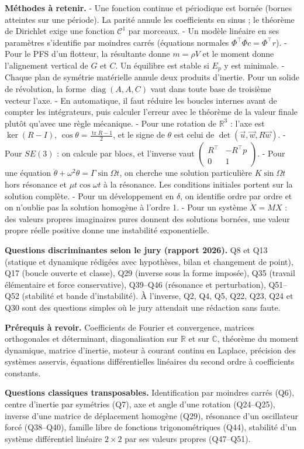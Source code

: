 \documentclass[11pt,a4paper]{article}
\begin{document}
\textbf{Méthodes à retenir.}
- Une fonction continue et périodique est bornée (bornes atteintes sur une période). La parité annule les coefficients en sinus ; le théorème de Dirichlet exige une fonction \(\mathcal C^1\) par morceaux.
- Un modèle linéaire en ses paramètres s'identifie par moindres carrés (équations normales \(\Phi^\top\Phi c=\Phi^\top r\)).
- Pour le PFS d'un flotteur, la résultante donne \(m=\rho V\) et le moment donne l'alignement vertical de \(G\) et \(C\). Un équilibre est stable si \(E_p\) y est minimale.
- Chaque plan de symétrie matérielle annule deux produits d'inertie. Pour un solide de révolution, la forme \(\operatorname{diag}(A,A,C)\) vaut dans toute base de troisième vecteur l'axe.
- En automatique, il faut réduire les boucles internes avant de compter les intégrateurs, puis calculer l'erreur avec le théorème de la valeur finale plutôt qu'avec une règle mécanique.
- Pour une rotation de \({\mathbb{R}}^3\) : l'axe est \(\ker(R-I)\), \(\cos\theta=\frac{\operatorname{tr}R-1}2\), et le signe de \(\theta\) est celui de \(\det(\vec u,\vec w,R\vec w)\).
- Pour \(SE(3)\) : on calcule par blocs, et l'inverse vaut \(\begin{pmatrix}R^\top&-R^\top p\\0&1\end{pmatrix}\).
- Pour une équation \(\ddot\theta+\omega^2\theta=\Gamma\sin\Omega t\), on cherche une solution particulière \(K\sin\Omega t\) hors résonance et \(\mu t\cos\omega t\) à la résonance. Les conditions initiales portent sur la solution complète.
- Pour un développement en \(\delta\), on identifie ordre par ordre et on n'oublie pas la solution homogène à l'ordre 1.
- Pour un système \(\dot X=MX\) : des valeurs propres imaginaires pures donnent des solutions bornées, une valeur propre réelle positive donne une instabilité exponentielle.

\textbf{Questions discriminantes selon le jury (rapport 2026).} Q8 et Q13 (statique et dynamique rédigées avec hypothèses, bilan et changement de point), Q17 (boucle ouverte et classe), Q29 (inverse sous la forme imposée), Q35 (travail élémentaire et force conservative), Q39--Q46 (résonance et perturbation), Q51--Q52 (stabilité et bande d'instabilité). À l'inverse, Q2, Q4, Q5, Q22, Q23, Q24 et Q30 sont des questions simples où le jury attendait une rédaction sans faute.

\textbf{Prérequis à revoir.} Coefficients de Fourier et convergence, matrices orthogonales et déterminant, diagonalisation sur \(\mathbb{R}\) et sur \(\mathbb{C}\), théorème du moment dynamique, matrice d'inertie, moteur à courant continu en Laplace, précision des systèmes asservis, équations différentielles linéaires du second ordre à coefficients constants.

\textbf{Questions classiques transposables.} Identification par moindres carrés (Q6), centre d'inertie par symétries (Q7), axe et angle d'une rotation (Q24--Q25), inverse d'une matrice de déplacement homogène (Q29), résonance d'un oscillateur forcé (Q38--Q40), famille libre de fonctions trigonométriques (Q44), stabilité d'un système différentiel linéaire \(2\times2\) par ses valeurs propres (Q47--Q51).
\end{document}
